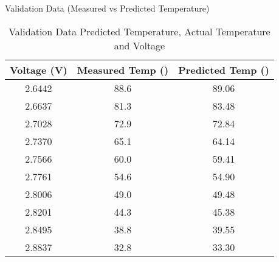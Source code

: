 \documentclass[journal]{IEEEtran}
\begin{document}
\begin{table}[h!]
\centering
\caption{Validation Data (Measured vs Predicted Temperature)}
\begin{tabular}{|c|c|c|}
\hline
	\textbf{Voltage (V)} & \textbf{Measured Temp (\degree{C})} & \textbf{Predicted Temp (\degree{C})} \\ 
\hline
2.6442 & 88.6 & 89.06 \\
2.6637 & 81.3 & 83.48 \\
2.7028 & 72.9 & 72.84 \\
2.7370 & 65.1 & 64.14 \\
2.7566 & 60.0 & 59.41 \\
2.7761 & 54.6 & 54.90 \\
2.8006 & 49.0 & 49.48 \\
2.8201 & 44.3 & 45.38 \\
2.8495 & 38.8 & 39.55 \\
2.8837 & 32.8 & 33.30 \\
\hline
\end{tabular}
        \caption{Validation Data Predicted Temperature, Actual Temperature and Voltage}
	\label{tab:Validation Data}
\end{table}
\end{document}
